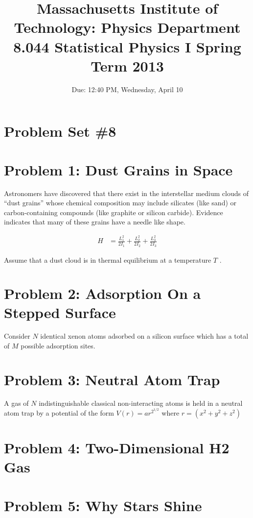 \documentclass[12pt,a4paper]{report}
\title{Massachusetts Institute of Technology: Physics Department 8.044 Statistical Physics I Spring Term 2013}
\date{Due: 12:40 PM, Wednesday, April 10}
\begin{document}
\maketitle

\section*{Problem Set \#8}

\section*{Problem 1: Dust Grains in Space}

Astronomers have discovered that there exist in the interstellar medium clouds of “dust grains” whose chemical composition may include silicates (like sand) or carbon-containing compounds (like graphite or silicon carbide). Evidence indicates that many of these grains have a needle like shape.

\begin{align*}
\label{eq:Hamiltionan}\tag{1}
H &= \frac{L_1^2}{2I_1} + \frac{L_2^2}{2I_2} + \frac{L_3^2}{2I_3}
\end{align*}

Assume that a dust cloud is in thermal equilibrium at a temperature $T$ .

\section*{Problem 2: Adsorption On a Stepped Surface}

Consider $N$ identical xenon atoms adsorbed on a silicon surface which has a total of $M$ possible adsorption sites.

\section*{Problem 3: Neutral Atom Trap}

A gas of $N$ indistinguishable classical non-interacting atoms is held in a neutral atom trap by a potential of the form $V (r) = ar^{2}^{1/2}$ where $r = (x^2 + y^2 + z^2)$

\section*{Problem 4: Two-Dimensional H2 Gas}

\section*{Problem 5: Why Stars Shine}
\end{document}
